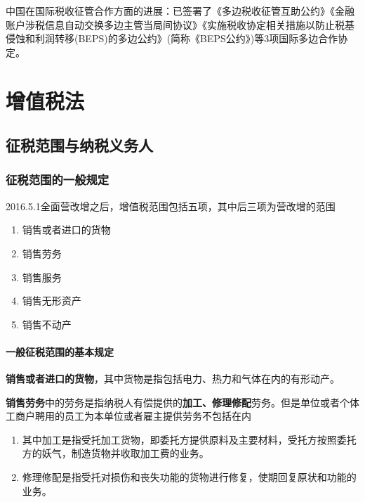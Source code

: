 \documentclass[UTF8,12pt]{ctexart}
\numberwithin{equation}{section} %
\numberwithin{figure}{section}
\numberwithin{table}{section}
\begin{document}
	中国在国际税收征管合作方面的进展：已签署了《多边税收征管互助公约》《金融账户涉税信息自动交换多边主管当局间协议》《实施税收协定相关措施以防止税基侵蚀和利润转移(BEPS)的多边公约》(简称《BEPS公约》)等3项国际多边合作协定。
	
	\section{增值税法}
	
	\subsection{征税范围与纳税义务人}
	\subsubsection{征税范围的一般规定}
	2016.5.1全面营改增之后，增值税范围包括五项，其中后三项为营改增的范围
	\begin{enumerate}
		\item 销售或者进口的货物
		
		\item 销售劳务
		
		\item 销售服务
		
		\item 销售无形资产
		
		\item 销售不动产
	\end{enumerate}
	
	\paragraph{一般征税范围的基本规定}
	\textbf{销售或者进口的货物}，其中货物是指包括电力、热力和气体在内的有形动产。
	
	\textbf{销售劳务}中的劳务是指纳税人有偿提供的\textbf{加工、修理修配}劳务。但是单位或者个体工商户聘用的员工为本单位或者雇主提供劳务不包括在内
	\begin{enumerate}
		\item 其中加工是指受托加工货物，即委托方提供原料及主要材料，受托方按照委托方的妖气，制造货物并收取加工费的业务。
		
		\item 修理修配是指受托对损伤和丧失功能的货物进行修复，使期回复原状和功能的业务。
	\end{enumerate}
	
\end{document}
